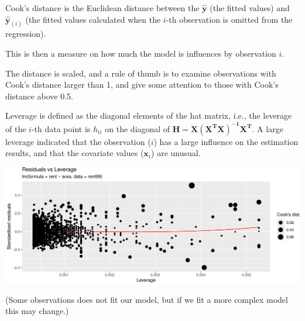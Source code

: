 \documentclass[
  ignorenonframetext,
]{beamer}
\newenvironment{Shaded}{\begin{snugshade}}{\end{snugshade}}
\newcommand{\AttributeTok}[1]{\textcolor[rgb]{0.13,0.29,0.53}{#1}}
\newcommand{\ConstantTok}[1]{\textcolor[rgb]{0.56,0.35,0.01}{#1}}
\newcommand{\FloatTok}[1]{\textcolor[rgb]{0.00,0.00,0.81}{#1}}
\newcommand{\FunctionTok}[1]{\textcolor[rgb]{0.13,0.29,0.53}{\textbf{#1}}}
\newcommand{\NormalTok}[1]{#1}
\newcommand{\SpecialCharTok}[1]{\textcolor[rgb]{0.81,0.36,0.00}{\textbf{#1}}}
\newcommand{\StringTok}[1]{\textcolor[rgb]{0.31,0.60,0.02}{#1}}
\begin{document}
\begin{frame}
Cook's distance is the Euclidean distance between the
\(\mathbf{\hat{y}}\) (the fitted values) and \(\mathbf{\hat{y}}_{(i)}\)
(the fitted values calculated when the \(i\)-th observation is omitted
from the regression).

This is then a measure on how much the model is influences by
observation \(i\).

The distance is scaled, and a rule of thumb is to examine observations
with Cook's distance larger than 1, and give some attention to those
with Cook's distance above 0.5.

Leverage is defined as the diagonal elements of the hat matrix, i.e.,
the leverage of the \(i\)-th data point is \(h_{ii}\) on the diagonal of
\(\mathbf{H = X(X^TX)^{-1}X^T}\). A large leverage indicated that the
observation (\(i\)) has a large influence on the estimation results, and
that the covariate values (\(\mathbf{x}_i\)) are unusual.
\end{frame}

\begin{frame}[fragile]
\begin{Shaded}
\end{Shaded}

\includegraphics{Module02MLRPresentationWeek1_files/figure-beamer/unnamed-chunk-10-1.pdf}

(Some observations does not fit our model, but if we fit a more complex
model this may change.)
\end{frame}
\end{document}
